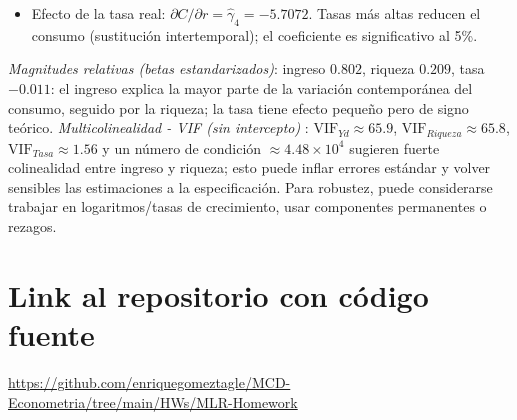 \documentclass[10pt]{article}
\begin{document}
\begin{enumerate}
{\begin{itemize}
        \item Efecto de la tasa real: \(\partial C/\partial r=\hat\gamma_4=-5.7072\). Tasas más altas reducen el consumo (sustitución intertemporal); el coeficiente es significativo al 5\%.
        \end{itemize}
        \emph{Magnitudes relativas (betas estandarizados)}: ingreso \(0.802\), riqueza \(0.209\), tasa \(-0.011\): el ingreso explica la mayor parte de la variación contemporánea del consumo, seguido por la riqueza; la tasa tiene efecto pequeño pero de signo teórico.
        \emph{Multicolinealidad - VIF (sin intercepto) }: \(\text{VIF}_{Yd}\approx 65.9\), \(\text{VIF}_{Riqueza}\approx 65.8\), \(\text{VIF}_{Tasa}\approx 1.56\) y un número de condición \(\approx 4.48\times10^{4}\) sugieren fuerte colinealidad entre ingreso y riqueza; esto puede inflar errores estándar y volver sensibles las estimaciones a la especificación. Para robustez, puede considerarse trabajar en logaritmos/tasas de crecimiento, usar componentes permanentes o rezagos.
    }
\end{enumerate}
\section{Link al repositorio con código fuente}
\url{https://github.com/enriquegomeztagle/MCD-Econometria/tree/main/HWs/MLR-Homework}
\end{document}
